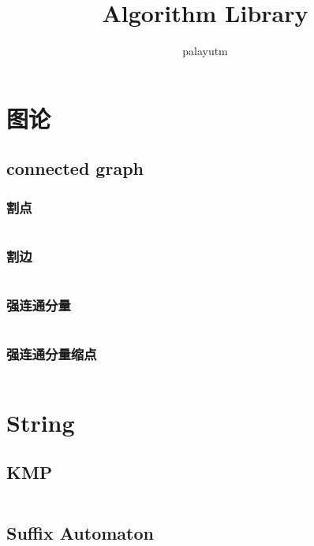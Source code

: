 \documentclass[a4paper,11pt]{article}
\author{palayutm}
\title{Algorithm Library}
\begin{document}
 
\maketitle %
\newpage %
\tableofcontents %
\newpage
\section{图论} %
\subsection{connected graph} %
\subsubsection{割点} %
\inputminted[breaklines]{c++}{graph/cutpoint.cc} %
\subsubsection{割边}
\inputminted[breaklines]{c++}{graph/cutedge.cc}
\subsubsection{强连通分量}
\inputminted[breaklines]{c++}{graph/scc.cc}
\subsubsection{强连通分量缩点}
\inputminted[breaklines]{c++}{graph/scc-ReductionPoints.cc}

\twocolumn  %
\newpage
\section{String}
\subsection{KMP}
\inputminted[breaklines]{c++}{string/kmp.cc}

\subsection{Suffix Automaton}
\inputminted[breaklines]{c++}{string/suffix-automaton.cc}

\end{document}
